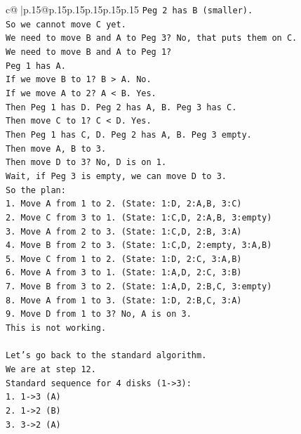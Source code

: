 \documentclass{article}
\begin{document}
{\begin{supertabular}{c@{$\;$}|p{.15\linewidth}@{}p{.15\linewidth}p{.15\linewidth}p{.15\linewidth}p{.15\linewidth}p{.15\linewidth}}
{{{\texttt{Peg 2 has B (smaller).} \\
\texttt{So we cannot move C yet.} \\
\texttt{We need to move B and A to Peg 3? No, that puts them on C.} \\
\texttt{We need to move B and A to Peg 1?} \\
\texttt{Peg 1 has A.} \\
\texttt{If we move B to 1? B > A. No.} \\
\texttt{If we move A to 2? A < B. Yes.} \\
\texttt{Then Peg 1 has D. Peg 2 has A, B. Peg 3 has C.} \\
\texttt{Then move C to 1? C < D. Yes.} \\
\texttt{Then Peg 1 has C, D. Peg 2 has A, B. Peg 3 empty.} \\
\texttt{Then move A, B to 3.} \\
\texttt{Then move D to 3? No, D is on 1.} \\
\texttt{Wait, if Peg 3 is empty, we can move D to 3.} \\
\texttt{So the plan:} \\
\texttt{1. Move A from 1 to 2. (State: 1:D, 2:A,B, 3:C)} \\
\texttt{2. Move C from 3 to 1. (State: 1:C,D, 2:A,B, 3:empty)} \\
\texttt{3. Move A from 2 to 3. (State: 1:C,D, 2:B, 3:A)} \\
\texttt{4. Move B from 2 to 3. (State: 1:C,D, 2:empty, 3:A,B)} \\
\texttt{5. Move C from 1 to 2. (State: 1:D, 2:C, 3:A,B)} \\
\texttt{6. Move A from 3 to 1. (State: 1:A,D, 2:C, 3:B)} \\
\texttt{7. Move B from 3 to 2. (State: 1:A,D, 2:B,C, 3:empty)} \\
\texttt{8. Move A from 1 to 3. (State: 1:D, 2:B,C, 3:A)} \\
\texttt{9. Move D from 1 to 3? No, A is on 3.} \\
\texttt{This is not working.} \\
\\ 
\texttt{Let's go back to the standard algorithm.} \\
\texttt{We are at step 12.} \\
\texttt{Standard sequence for 4 disks (1{-}>3):} \\
\texttt{1. 1{-}>3 (A)} \\
\texttt{2. 1{-}>2 (B)} \\
\texttt{3. 3{-}>2 (A)} \\
}}}
\end{supertabular}}
\end{document}
